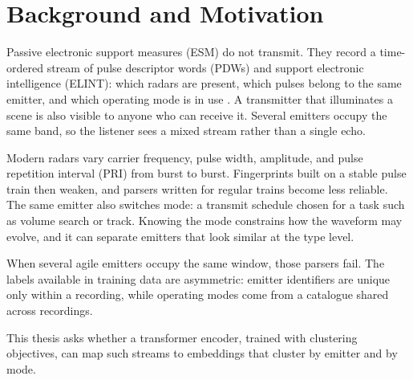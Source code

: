 \section{Background and Motivation}\label{sec:intro:background}

Passive electronic support measures (ESM) do not transmit.
%
They record a time-ordered stream of pulse descriptor words (PDWs) and support electronic intelligence (ELINT): which radars are present, which pulses belong to the same emitter, and which operating mode is in use \parencite{wiley2006elint,skolnik2008radar}.
%
A transmitter that illuminates a scene is also visible to anyone who can receive it.
Several emitters occupy the same band, so the listener sees a mixed stream rather than a single echo.

Modern radars vary carrier frequency, pulse width, amplitude, and pulse repetition interval (PRI) from burst to burst.
%
Fingerprints built on a stable pulse train then weaken, and parsers written for regular trains become less reliable.
The same emitter also switches mode: a transmit schedule chosen for a task such as volume search or track.
Knowing the mode constrains how the waveform may evolve, and it can separate emitters that look similar at the type level.

When several agile emitters occupy the same window, those parsers fail.
The labels available in training data are asymmetric: emitter identifiers are unique only within a recording, while operating modes come from a catalogue shared across recordings.

This thesis asks whether a transformer encoder, trained with clustering objectives, can map such streams to embeddings that cluster by emitter and by mode.
